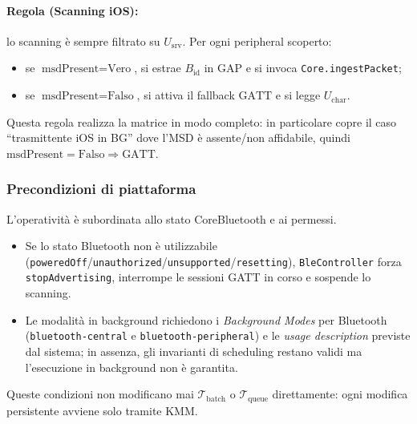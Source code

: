 \documentclass[a4paper,11pt,table,dvipsnames]{article}
\begin{document}
\paragraph{Regola (Scanning iOS):}
lo scanning è sempre filtrato su \(U_{\text{srv}}\). Per ogni peripheral scoperto:
\begin{itemize}[nosep]
    \item se \(\text{msdPresent}=\text{Vero}\), si estrae \(B_{\text{id}}\) in \(\text{GAP}\) e si invoca \texttt{Core.ingestPacket};
    \item se \(\text{msdPresent}=\text{Falso}\), si attiva il fallback \(\text{GATT}\) e si legge \(U_{\text{char}}\).
\end{itemize}
Questa regola realizza la matrice in modo completo: in particolare copre il caso “trasmittente iOS in BG” dove l’MSD è assente/non affidabile, quindi \(\text{msdPresent}=\text{Falso}\Rightarrow\text{GATT}\).

\subsubsection{Precondizioni di piattaforma}
L’operatività è subordinata allo stato CoreBluetooth e ai permessi.
\begin{itemize}[nosep]
    \item Se lo stato Bluetooth non è utilizzabile (\texttt{poweredOff}/\texttt{unauthorized}/\texttt{unsupported}/\texttt{resetting}), \texttt{BleController} forza \texttt{stopAdvertising}, interrompe le sessioni GATT in corso e sospende lo scanning.
    \item Le modalità in background richiedono i \emph{Background Modes} per Bluetooth (\texttt{bluetooth-central} e \texttt{bluetooth-peripheral}) e le \emph{usage description} previste dal sistema; in assenza, gli invarianti di scheduling restano validi ma l’esecuzione in background non è garantita.
\end{itemize}
Queste condizioni non modificano mai \(\mathcal{T}_{\text{batch}}\) o \(\mathcal{T}_{\text{queue}}\) direttamente: ogni modifica persistente avviene solo tramite KMM.
\end{document}
